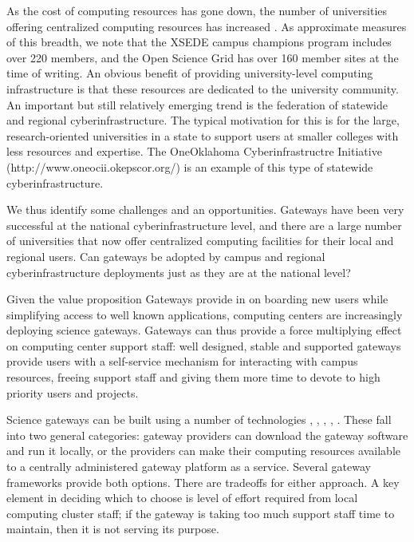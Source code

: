 \documentclass[sigconf]{acmart}
\begin{document}
As the cost of computing resources has gone down, the number of universities offering centralized computing resources has increased \cite{hacker2007making}. As approximate measures of this breadth, we note that the XSEDE campus champions program includes over 220 members, and the Open Science Grid has over 160 member sites at the time of writing. An obvious benefit of providing university-level computing infrastructure is that these resources are dedicated to the university community. An important but still relatively emerging trend is the federation of statewide and regional cyberinfrastructure. The typical motivation for this is for the large, research-oriented universities in a state to support users at smaller colleges with less resources and expertise. The OneOklahoma Cyberinfrastructre Initiative (http://www.oneocii.okepscor.org/) is an example of this type of statewide cyberinfrastructure.

We thus identify some challenges and an opportunities. Gateways have been very successful at the national cyberinfrastructure level, and there are a large number of universities that now offer centralized computing facilities for their local and regional users. Can gateways be adopted by campus and regional cyberinfrastructure deployments just as they are at the national level?  

Given the value proposition Gateways provide in on boarding new users while simplifying access to well known applications, computing centers are increasingly deploying science gateways.  Gateways can thus provide a force multiplying effect on computing center support staff: well designed, stable and supported gateways provide users with a self-service mechanism for interacting with campus resources, freeing support staff and giving them more time to devote to high priority users and projects. 

Science gateways can be built using a number of technologies \cite{mclennan2010hubzero}, \cite{dooley2012software}, \cite{marru2011apache}, \cite{goecks2010galaxy}, \cite{kluyver2016jupyter}.  These fall into two general categories: gateway providers can download the gateway software and run it locally, or the providers can make their computing resources available to a centrally administered gateway platform as a service. Several gateway frameworks provide both options.  There are tradeoffs for either approach. A key element in deciding which to choose is level of effort required from local computing cluster staff; if the gateway is taking too much support staff time to maintain, then it is not serving its purpose. 
\end{document}
